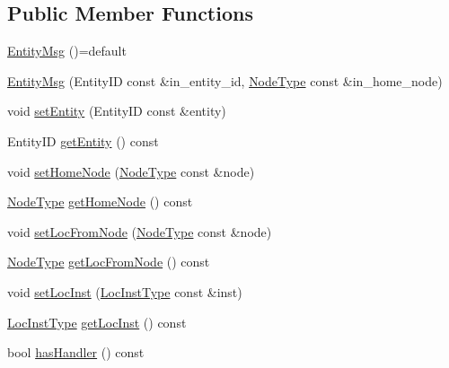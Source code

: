 \subsection*{Public Member Functions}
\begin{DoxyCompactItemize}
\item 
\hyperlink{structvt_1_1location_1_1_entity_msg_a962b4711acd88b3be14cde800dcfe967}{Entity\+Msg} ()=default
\item 
\hyperlink{structvt_1_1location_1_1_entity_msg_a20a8679b67ce88ab88d2fd915dae6d23}{Entity\+Msg} (Entity\+ID const \&in\+\_\+entity\+\_\+id, \hyperlink{namespacevt_a866da9d0efc19c0a1ce79e9e492f47e2}{Node\+Type} const \&in\+\_\+home\+\_\+node)
\item 
void \hyperlink{structvt_1_1location_1_1_entity_msg_a76a6b14309f9a20a0b6cd2afa9a80917}{set\+Entity} (Entity\+ID const \&entity)
\item 
Entity\+ID \hyperlink{structvt_1_1location_1_1_entity_msg_af288322a731d03cea544bc2e60bb10bd}{get\+Entity} () const
\item 
void \hyperlink{structvt_1_1location_1_1_entity_msg_af2111f7feda34a83a2132d396647f77f}{set\+Home\+Node} (\hyperlink{namespacevt_a866da9d0efc19c0a1ce79e9e492f47e2}{Node\+Type} const \&node)
\item 
\hyperlink{namespacevt_a866da9d0efc19c0a1ce79e9e492f47e2}{Node\+Type} \hyperlink{structvt_1_1location_1_1_entity_msg_a5f0675e4fca11168fee86e8af122e289}{get\+Home\+Node} () const
\item 
void \hyperlink{structvt_1_1location_1_1_entity_msg_afd28b1e836177cb58d112b25edce1210}{set\+Loc\+From\+Node} (\hyperlink{namespacevt_a866da9d0efc19c0a1ce79e9e492f47e2}{Node\+Type} const \&node)
\item 
\hyperlink{namespacevt_a866da9d0efc19c0a1ce79e9e492f47e2}{Node\+Type} \hyperlink{structvt_1_1location_1_1_entity_msg_a38c36e0dd8a9207defaf44458a151d61}{get\+Loc\+From\+Node} () const
\item 
void \hyperlink{structvt_1_1location_1_1_entity_msg_a7bbd80a3e29d729cd7be84acb167ff90}{set\+Loc\+Inst} (\hyperlink{namespacevt_1_1location_a4db6456e8024af2d23fc5ae560fef866}{Loc\+Inst\+Type} const \&inst)
\item 
\hyperlink{namespacevt_1_1location_a4db6456e8024af2d23fc5ae560fef866}{Loc\+Inst\+Type} \hyperlink{structvt_1_1location_1_1_entity_msg_a9393448a6cadfde96c2eab29d28b3e5b}{get\+Loc\+Inst} () const
\item 
bool \hyperlink{structvt_1_1location_1_1_entity_msg_a0796bd63248dae2b457aa2eedc345743}{has\+Handler} () const

\end{DoxyCompactItemize}
